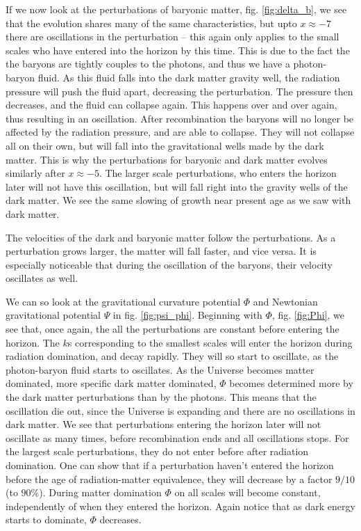 \documentclass[a4paper,norsk, 10pt]{article}
\begin{document}
If we now look at the perturbations of baryonic matter, fig. \ref{fig:delta_b}, we see that the evolution shares many of the same characteristics, but upto $x \approx -7$ there are oscillations in the perturbation -- this again only applies to the small scales who have entered into the horizon by this time. This is due to the fact the the baryons are tightly couples to the photons, and thus we have a photon-baryon fluid. As this fluid falls into the dark matter gravity well, the radiation pressure will push the fluid apart, decreasing the perturbation. The pressure then decreases, and the fluid can collapse again. This happens over and over again, thus resulting in an oscillation. After recombination the baryons will no longer be affected by the radiation pressure, and are able to collapse. They will not collapse all on their own, but will fall into the gravitational wells made by the dark matter. This is why the perturbations for baryonic and dark matter evolves similarly after $x\approx -5$. The larger scale perturbations, who enters the horizon later will not have this oscillation, but will fall right into the gravity wells of the dark matter. We see the same slowing of growth near present age as we saw with dark matter.

The velocities of the dark and baryonic matter follow the perturbations. As a perturbation grows larger, the matter will fall faster, and vice versa. It is especially noticeable that during the oscillation of the baryons, their velocity oscillates as well. 

We can so look at the gravitational curvature potential $\Phi$ and Newtonian gravitational potential $\Psi$ in fig. \ref{fig:psi_phi}. Beginning with $\Phi$, fig. \ref{fig:Phi}, we see that, once again, the all the perturbations are constant before entering the horizon. The $k$s corresponding to the smallest scales will enter the horizon during radiation domination, and decay rapidly. They will so start to oscillate, as the photon-baryon fluid starts to oscillates. As the Universe becomes matter dominated, more specific dark matter dominated, $\Phi$ becomes determined more by the dark matter perturbations than by the photons. This means that the oscillation die out, since the Universe is expanding and there are no oscillations in dark matter. We see that perturbations entering the horizon later will not oscillate as many times, before recombination ends and all oscillations stops. For the largest scale perturbations, they do not enter before after radiation domination. One can show that if a perturbation haven't entered the horizon before the age of radiation-matter equivalence, they will decrease by a factor $9/10$ (to $90\%$). During matter domination $\Phi$ on all scales will become constant, independently of when they entered the horizon. Again notice that as dark energy starts to dominate, $\Phi$ decreases.
\end{document}
